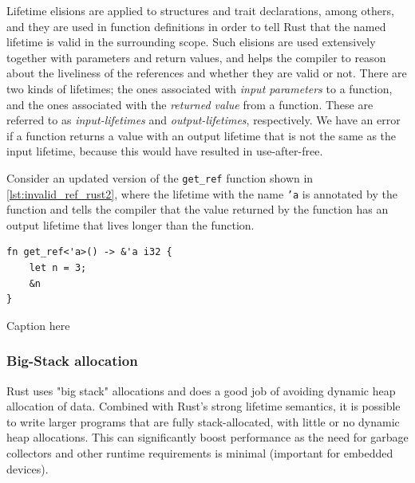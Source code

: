 Lifetime elisions are applied to structures and trait declarations, among others, and they are used
in function definitions in order to tell Rust that the named lifetime is valid in the surrounding
scope.  Such elisions are used extensively together with
parameters and return values, and helps the compiler to reason about the liveliness of the
references and whether they are valid or not. There are two kinds of lifetimes; the ones associated
with \emph{input parameters} to a function, and the ones associated with the \emph{returned value}
from a function. These are referred to as \emph{input-lifetimes} and \emph{output-lifetimes},
respectively. We have an error if a function returns a value with an output lifetime that is not the
same as the input lifetime, because this would have resulted in use-after-free.

Consider an updated version of the \texttt{get\_ref} function shown in
\autoref{lst:invalid_ref_rust2}, where the lifetime with the name \texttt{'a} is annotated by the
function and tells the compiler that the value returned by the function has an output lifetime that
lives longer than the function. 


\begin{listing}[tb]
\begin{verbatim}
fn get_ref<'a>() -> &'a i32 {
    let n = 3;
    &n
}
\end{verbatim}
\caption{Caption here}
\label{lst:invalid_ref_rust}
\end{listing}



\subsubsection{Big-Stack allocation}
\label{par:big_stack}

Rust uses "big stack" allocations 
and does a good job of avoiding dynamic heap allocation of data. Combined with Rust's strong
lifetime semantics, it is possible to write larger programs that are fully stack-allocated, with
little or no dynamic heap allocations. This can significantly boost performance as the need for
garbage collectors and other runtime requirements is minimal (important for embedded devices).

